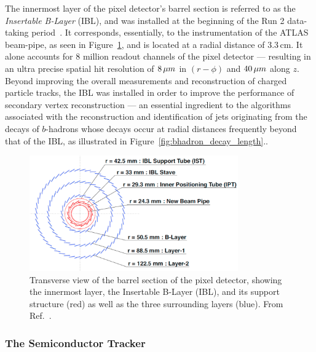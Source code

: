 The innermost layer of the pixel detector's barrel section is referred to as the
\textit{Insertable B-Layer} (IBL), and was installed at the beginning of the Run 2
data-taking period~\cite{Capeans:1291633}.
It corresponds, essentially, to the instrumentation of the ATLAS beam-pipe, as seen in Figure~\ref{fig:pixel_detector_trans},
and is located at a radial distance of 3.3\,cm.
It alone accounts for 8 million readout channels of
the pixel detector --- resulting in an ultra precise spatial hit resolution of $8\,\mu m$ in $(r-\phi)$ and
$40\,\mu m$ along $z$.
Beyond improving the overall measurements and reconstruction of charged particle tracks,
the IBL was installed in order to improve the performance of secondary vertex
reconstruction --- an essential ingredient to the algorithms associated with
the reconstruction and identification of jets originating from the decays
of $b$-hadrons whose decays occur at radial distances frequently beyond that
of the IBL, as illustrated in Figure~\ref{fig:bhadron_decay_length}..

\begin{figure}[!htb]
    \begin{center}
        \includegraphics[width=0.8\textwidth]{figures/chapter2/inner_detector/pixel_detector_trans}
        \caption{
            Transverse view of the barrel section of the pixel detector, showing
            the innermost layer, the Insertable B-Layer (IBL), and its support structure (red) as well as the
            three surrounding layers (blue). From Ref.~\cite{Backhaus:2016ctq}.
        }
        \label{fig:pixel_detector_trans}
    \end{center}
\end{figure}

\subsubsection{The Semiconductor Tracker}
\label{sec:id_sct}

